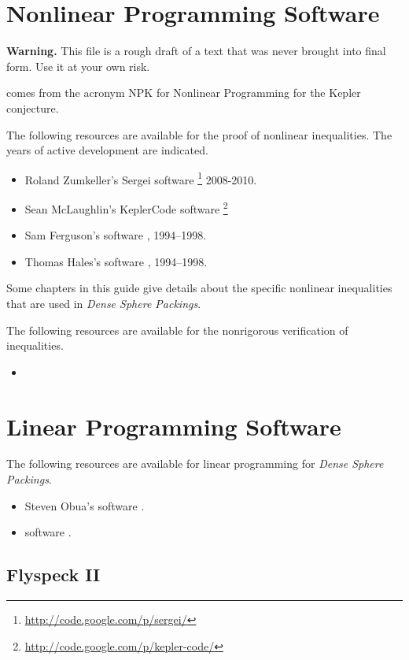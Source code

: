 
\chapter{Nonlinear Programming Software}

{\bf Warning.}  This file is a rough draft of a text that was never brought into final form.
Use it at your own risk.

 comes from the acronym NPK for Nonlinear Programming for the Kepler conjecture.

The following resources are available for the proof of nonlinear inequalities.  The years of active development are indicated.

\begin{itemize}
\item Roland Zumkeller's 
Sergei software%
\footnote{\url{http://code.google.com/p/sergei/}} %
 2008-2010.
\item Sean McLaughlin's KeplerCode software%
\footnote{\url{http://code.google.com/p/kepler-code/}}%
\item Sam Ferguson's software \url{}, 1994--1998.
\item Thomas Hales's software \url{}, 1994--1998.
\end{itemize}

Some chapters in this guide give details about the specific nonlinear inequalities that are
used in {\it Dense Sphere Packings}.

The following resources are available for the nonrigorous verification of inequalities.

\begin{itemize}
\item 
\end{itemize}

\chapter{Linear Programming Software}

The following resources are available for linear programming for {\it Dense Sphere Packings}.

\begin{itemize}
\item Steven Obua's software \url{}.
\item {} software \url{}.
\end{itemize}

\section{Flyspeck II}


